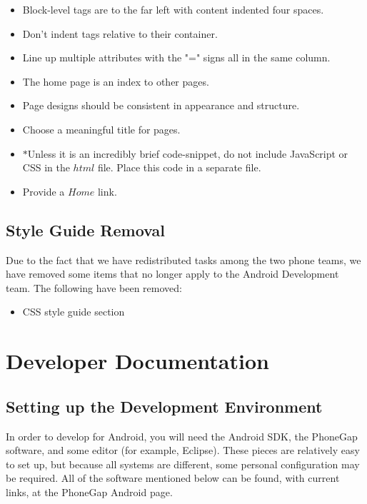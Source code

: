 \documentclass[12pt]{article}
\begin{document}
\begin{itemize}

\item Block-level tags are to the far left with content indented four spaces.

\item Don't indent tags relative to their container.

\item Line up multiple attributes with the "=" signs all in the same column.

\item The home page is an index to other pages.

\item Page designs should be consistent in appearance and structure.

\item Choose a meaningful title for pages.

\item $*$Unless it is an incredibly brief code-snippet, do not include JavaScript or CSS in the $html$ file.  Place this code in a separate file.

\item Provide a $Home$ link.

\end{itemize}



\subsection{Style Guide Removal}

Due to the fact that we have redistributed tasks among the two phone teams, we have removed some items that no longer apply to the Android Development team.  The following have been removed: 



\begin{itemize}

\item CSS style guide section

\end{itemize}

\section{Developer Documentation}

\label{sec:developerdocumentation}

\subsection{Setting up the Development Environment}
In order to develop for Android, you will need the Android SDK, the PhoneGap software, and some editor (for example, Eclipse).  These pieces are relatively easy to set up, but because all systems are different, some personal configuration may be required.  All of the software mentioned below can be found, with current links, at the PhoneGap Android page\cite{PhoneGap-Android}.  
\end{document}
